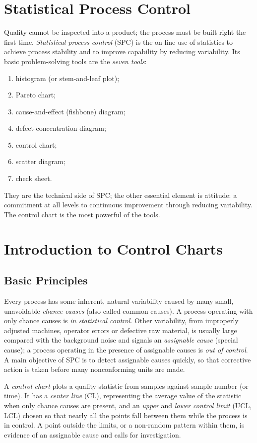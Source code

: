 \section{Statistical Process Control}

Quality cannot be inspected into a product; the process must be built right the first time. \emph{Statistical process control} (SPC) is the on-line use of statistics to achieve process stability and to improve capability by reducing variability. Its basic problem-solving tools are the \emph{seven tools}:
\begin{enumerate}[label=(\arabic*)]
  \item histogram (or stem-and-leaf plot);
  \item Pareto chart;
  \item cause-and-effect (fishbone) diagram;
  \item defect-concentration diagram;
  \item control chart;
  \item scatter diagram;
  \item check sheet.
\end{enumerate}
They are the technical side of SPC; the other essential element is attitude: a commitment at all levels to continuous improvement through reducing variability. The control chart is the most powerful of the tools.

\section{Introduction to Control Charts}

\subsection{Basic Principles}

Every process has some inherent, natural variability caused by many small, unavoidable \emph{chance causes} (also called common causes). A process operating with only chance causes is \emph{in statistical control}. Other variability, from improperly adjusted machines, operator errors or defective raw material, is usually large compared with the background noise and signals an \emph{assignable cause} (special cause); a process operating in the presence of assignable causes is \emph{out of control}. A main objective of SPC is to detect assignable causes quickly, so that corrective action is taken before many nonconforming units are made.

A \emph{control chart} plots a quality statistic from samples against sample number (or time). It has a \emph{center line} (CL), representing the average value of the statistic when only chance causes are present, and an \emph{upper} and \emph{lower control limit} (UCL, LCL) chosen so that nearly all the points fall between them while the process is in control. A point outside the limits, or a non-random pattern within them, is evidence of an assignable cause and calls for investigation.

